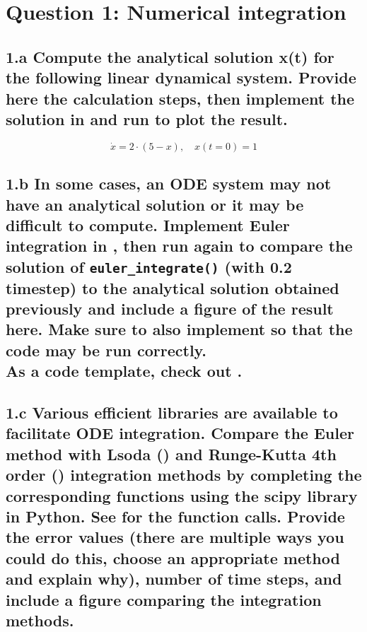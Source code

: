 \documentclass{cmc}
\begin{document}
\section*{Question 1: Numerical integration}

\subsection*{1.a Compute the analytical solution x(t) %
  for the following linear dynamical system. Provide here the calculation steps,
  then implement the solution in
  and run  to plot the result.}

\begin{equation}
  \label{eq:ode-1}
  \dot{x} = 2 \cdot (5 - x), \quad x(t=0)=1
\end{equation}


\vspace{0.3\textheight}



\subsection*{1.b In some cases, an ODE system may not have an analytical
  solution or it may be difficult to compute. Implement Euler integration in
  , %
  then run  again to compare the solution of
  \texttt{eu\-ler\_integr\-ate()} (with 0.2 timestep) %
  to the analytical solution obtained previously and include a figure of the
  result here. Make sure to also implement
  so that the code may be run correctly. \\ As a code template, check out
  .}



\vspace{0.3\textheight}



\clearpage

\subsection*{1.c Various efficient libraries are available to facilitate ODE
  integration. Compare the Euler method with Lsoda
  () %
  and Runge-Kutta 4th order
  () %
  integration methods by completing the corresponding functions using the scipy
  library in Python. See  %
  for the function calls. Provide the error values (there are multiple ways you
  could do this, choose an appropriate method and explain why), number of time
  steps, and include a figure comparing the integration methods. }
\end{document}
